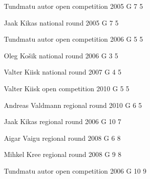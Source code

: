 \documentclass[11pt]{article}
\begin{document}
\ylDisplay{} %
{Tundmatu autor} %
{open competition} %
{2005} %
{G 7} %
{5} %
{

\ifEngSolution
\fi
}

\ylDisplay{} %
{Jaak Kikas} %
{national round} %
{2005} %
{G 7} %
{5} %
{

\ifEngSolution
\fi
}

\ylDisplay{} %
{Tundmatu autor} %
{open competition} %
{2006} %
{G 5} %
{5} %
{

\ifEngSolution
\fi
}

\ylDisplay{} %
{Oleg Košik} %
{national round} %
{2006} %
{G 3} %
{5} %
{

\ifEngSolution
\fi
}

\ylDisplay{} %
{Valter Kiisk} %
{national round} %
{2007} %
{G 4} %
{5} %
{

\ifEngSolution
\fi
}

\ylDisplay{} %
{Valter Kiisk} %
{open competition} %
{2010} %
{G 5} %
{5} %
{

\ifEngSolution
\fi
}

\ylDisplay{} %
{Andreas Valdmann} %
{regional round} %
{2010} %
{G 6} %
{5} %
{

\ifEngSolution
\fi
}

\ylDisplay{} %
{Jaak Kikas} %
{regional round} %
{2006} %
{G 10} %
{7} %
{

\ifEngSolution
\fi
}

\ylDisplay{} %
{Aigar Vaigu} %
{regional round} %
{2008} %
{G 6} %
{8} %
{

\ifEngSolution
\fi
}

\ylDisplay{} %
{Mihkel Kree} %
{regional round} %
{2008} %
{G 9} %
{8} %
{

\ifEngSolution
\fi
}

\ylDisplay{} %
{Tundmatu autor} %
{open competition} %
{2006} %
{G 10} %
{9} %
{

\ifEngSolution
\fi
}
\end{document}

